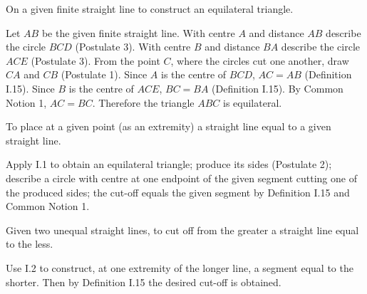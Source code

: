 \documentclass{rrxiv}
\begin{document}
\begin{claim}
\label{prop:I.1}
On a given finite straight line to construct an equilateral triangle.
\end{claim}

\begin{evidence}[Proof of I.1]
\label{ev:I.1}

Let $AB$ be the given finite straight line.  With centre $A$ and
distance $AB$ describe the circle $BCD$ (Postulate 3).  With centre
$B$ and distance $BA$ describe the circle $ACE$ (Postulate 3).  From
the point $C$, where the circles cut one another, draw $CA$ and $CB$
(Postulate 1).  Since $A$ is the centre of $BCD$, $AC = AB$
(Definition I.15).  Since $B$ is the centre of $ACE$, $BC = BA$
(Definition I.15).  By Common Notion 1, $AC = BC$.  Therefore the
triangle $ABC$ is equilateral.
\end{evidence}

\begin{claim}
\label{prop:I.2}
To place at a given point (as an extremity) a straight line equal to a
given straight line.
\end{claim}
\begin{evidence}[Proof of I.2]
\label{ev:I.2}
Apply I.1 to obtain an equilateral triangle; produce its sides
(Postulate 2); describe a circle with centre at one endpoint of the
given segment cutting one of the produced sides; the cut-off equals
the given segment by Definition I.15 and Common Notion 1.
\end{evidence}

\begin{claim}
\label{prop:I.3}
Given two unequal straight lines, to cut off from the greater a
straight line equal to the less.
\end{claim}
\begin{evidence}[Proof of I.3]
\label{ev:I.3}
Use I.2 to construct, at one extremity of the longer line, a segment
equal to the shorter.  Then by Definition I.15 the desired cut-off is
obtained.
\end{evidence}
\end{document}
